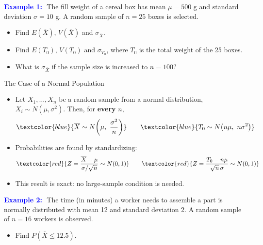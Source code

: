 \documentclass[12pt]{beamer}
\newcommand{\fitO}{}
\newcommand{\exlists}{\setlength{\itemsep}{0pt}}
\newcommand{\Xbar}{\overline{X}}
\begin{document}
\begin{frame}[t]{}\fitO\exlists
\textcolor{blue}{\textbf{Example 1:}}\,\ The fill weight of a cereal box has
mean $\mu=500$ g and standard deviation $\sigma=10$ g. A random sample of
$n=25$ boxes is selected.
\begin{itemize}
\item[a)] Find $E(\Xbar)$, $V(\Xbar)$ and $\sigma_{\Xbar}$.\\[0.2cm]
\end{itemize}
\end{frame}

\begin{frame}[t]{}\fitO\exlists
\begin{itemize}
\item[b)] Find $E(T_0)$, $V(T_0)$ and $\sigma_{T_0}$, where $T_0$ is the total weight of the 25 boxes.\\[3.4cm]
\item[c)] What is $\sigma_{\Xbar}$ if the sample size is increased to $n=100$?\\[0.2cm]
\end{itemize}
\end{frame}

\begin{frame}[t]{The Case of a Normal Population}
\begin{itemize}
\item Let $X_1,\dots,X_n$ be a random sample from a normal distribution,
  $X_i\sim N(\mu,\sigma^2)$. Then, for \textbf{every} $n$,
\[
\textcolor{blue}{\Xbar\sim N\!\left(\mu,\ \frac{\sigma^2}{n}\right)}
\qquad
\textcolor{blue}{T_0\sim N\!\left(n\mu,\ n\sigma^2\right)}
\]
\item Probabilities are found by standardizing:
\[
\textcolor{red}{Z=\frac{\Xbar-\mu}{\sigma/\sqrt{n}}\sim N(0,1)}
\qquad
\textcolor{red}{Z=\frac{T_0-n\mu}{\sqrt{n}\,\sigma}\sim N(0,1)}
\]
\item This result is exact: no large-sample condition is needed.
\end{itemize}
\end{frame}

\begin{frame}[t]{}\fitO\exlists
\textcolor{blue}{\textbf{Example 2:}}\,\ The time (in minutes) a worker needs to
assemble a part is normally distributed with mean 12 and standard deviation 2.
A random sample of $n=16$ workers is observed.
\begin{itemize}
\item[a)] Find $P(\Xbar\le 12.5)$.\\[0.2cm]
\end{itemize}
\end{frame}
\end{document}
